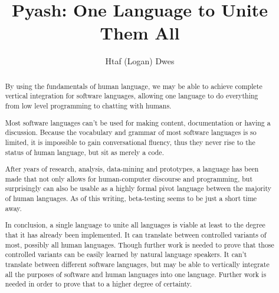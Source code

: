 \documentclass[10pt, sigplan, preprint]{acmart}
\begin{document}
\title[]{Pyash: One Language to Unite Them All}


\author{Htaf (Logan) Dwes}

\renewcommand{\shortauthors}{Logan Dwes}


\begin{abstract}%
    By using the fundamentals of human language, we may be able to achieve
    complete vertical integration for software languages, allowing one language
    to do everything from low level programming to chatting with humans. 

  Most
  software languages can't be used for making content, documentation or having a
  discussion. Because the vocabulary and grammar of most software languages is
  so limited, it is impossible to gain conversational fluency, thus they never
  rise to the status of human language, but sit as merely a code. 


  After years of research, analysis, data-mining and prototypes, 
  a language has been made that not only allows for human-computer discourse and
  programming, but surprisingly can also be usable as a highly formal 
  pivot language between the majority of human languages. As of this
  writing, beta-testing seems to be just a short time away. 

  In conclusion, a single language to unite all languages is viable at least to
  the degree that it has already been implemented. 
  It can translate between controlled variants of most, possibly all human
  languages. Though further work is needed to prove that those controlled 
  variants can be easily learned by natural language speakers.  It can't 
  translate between different software languages, but may be able to vertically
  integrate all the purposes of software and human languages into one language.
  Further work is needed in order to prove that to a higher degree of certainty.
\end{abstract}
\end{document}
